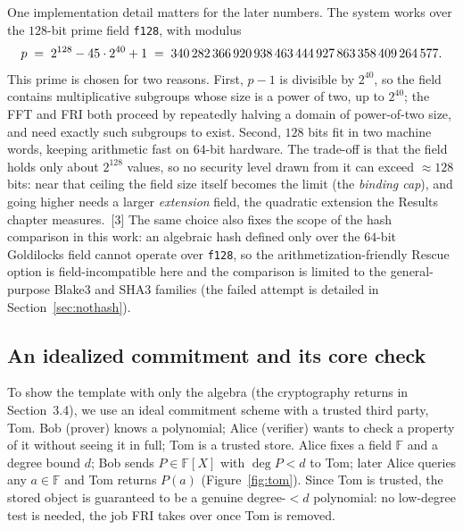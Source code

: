 \documentclass[11pt]{article}
\begin{document}
One implementation detail matters for the later numbers.\label{sec:field} The system works over the
$128$-bit prime field \texttt{f128}, with modulus
\begin{equation}
  p \;=\; 2^{128} - 45\cdot 2^{40} + 1 \;=\; \text{\num{340282366920938463444927863358409264577}} .
  \label{eq:field}
\end{equation}
This prime is chosen for two reasons. First, $p-1$ is divisible by $2^{40}$, so the field contains
multiplicative subgroups whose size is a power of two, up to $2^{40}$; the FFT and FRI both proceed by
repeatedly halving a domain of power-of-two size, and need exactly such subgroups to exist. Second, $128$
bits fit in two machine words, keeping arithmetic fast on $64$-bit hardware. The trade-off is that the
field holds only about $2^{128}$ values, so no security level drawn from it can exceed $\approx\!128$
bits: near that ceiling the field size itself becomes the limit (the \emph{binding cap}), and going
higher needs a larger \emph{extension} field, the quadratic extension the Results chapter measures.~[3]
The same choice also fixes the scope of the hash comparison in this work: an algebraic hash defined only
over the $64$-bit Goldilocks field cannot operate over \texttt{f128}, so the arithmetization-friendly
Rescue option is field-incompatible here and the comparison is limited to the general-purpose Blake3 and
SHA3 families (the failed attempt is detailed in Section~\ref{sec:nothash}).

\subsection{An idealized commitment and its core check}

To show the template with only the algebra (the cryptography returns in Section~3.4), we use an ideal
commitment scheme with a trusted third party, Tom. Bob (prover) knows a polynomial; Alice (verifier)
wants to check a property of it without seeing it in full; Tom is a trusted store. Alice fixes a field
$\mathbb{F}$ and a degree bound $d$; Bob sends $P\in\mathbb{F}[X]$ with $\deg P<d$ to Tom; later Alice
queries any $a\in\mathbb{F}$ and Tom returns $P(a)$ (Figure~\ref{fig:tom}). Since Tom is trusted, the
stored object is guaranteed to be a genuine degree-$<d$ polynomial: no low-degree test is needed, the
job FRI takes over once Tom is removed.
\end{document}
